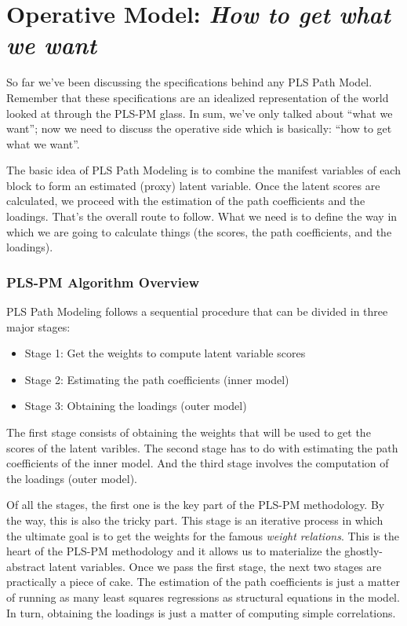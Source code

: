 \documentclass[12pt]{book}\usepackage{graphicx, color}
\begin{document}
\section{Operative Model: \textit{How to get what we want}}
So far we've been discussing the specifications behind any PLS Path Model. Remember that these specifications are an idealized representation of the world looked at through the PLS-PM glass. In sum, we've only talked about ``what we want''; now we need to discuss the operative side which is basically: ``how to get what we want''.

The basic idea of PLS Path Modeling is to combine the manifest variables of each block to form an estimated (proxy) latent variable. Once the latent scores are calculated, we proceed with the estimation of the path coefficients and the loadings. That's the overall route to follow. What we need is to define the way in which we are going to calculate things (the scores, the path coefficients, and the loadings). 


\subsubsection*{PLS-PM Algorithm Overview}
PLS Path Modeling follows a sequential procedure that can be divided in three major stages:
\begin{itemize}
 \item[] Stage 1: Get the weights to compute latent variable scores
 \item[] Stage 2: Estimating the path coefficients (inner model)
 \item[] Stage 3: Obtaining the loadings (outer model)
\end{itemize}

\vspace{2mm}
The first stage consists of obtaining the weights that will be used to get the scores of the latent varibles. The second stage has to do with estimating the path coefficients of the inner model. And the third stage involves the computation of the loadings (outer model). 

Of all the stages, the first one is the key part of the PLS-PM methodology. By the way, this is also the tricky part. This stage is an iterative process in which the ultimate goal is to get the weights for the famous \textit{weight relations}. This is the heart of the PLS-PM methodology and it allows us to materialize the ghostly-abstract latent variables. Once we pass the first stage, the next two stages are practically a piece of cake. The estimation of the path coefficients is just a matter of running as many least squares regressions as structural equations in the model. In turn, obtaining the loadings is just a matter of computing simple correlations. 
\end{document}
